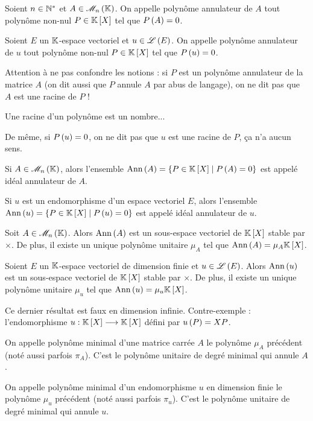 \begin{defi}
Soient \(n\in\mathbb{N}^*\) et \(A\in\M{n}\). On appelle polynôme annulateur de \(A\) tout polynôme non-nul \(P\in\poly\) tel que \(P\left(A\right)=0\).

Soient \(E\) un \(\mathbb{K}\)-espace vectoriel et \(u\in\mathscr{L}\left(E\right)\). On appelle polynôme annulateur de \(u\) tout polynôme non-nul \(P\in\poly\) tel que \(P\left(u\right)=0\).
\end{defi}

\begin{rem}
Attention à ne pas confondre les notions : si \(P\) est un polynôme annulateur de la matrice \(A\) (on dit aussi que \(P\) annule \(A\) par abus de langage), on ne dit pas que \(A\) est une racine de \(P\) !

Une racine d'un polynôme est un nombre...

De même, si \(P\left(u\right)=0\), on ne dit pas que \(u\) est une racine de \(P\), ça n'a aucun sens.
\end{rem}

\begin{defi}
Si \(A\in\M{n}\), alors l'ensemble \(\Ann{A}=\accol{P\in\poly\tq P\paren{A}=0}\) est appelé idéal annulateur de \(A\).

Si \(u\) est un endomorphisme d'un espace vectoriel \(E\), alors l'ensemble \(\Ann{u}=\accol{P\in\poly\tq P\paren{u}=0}\) est appelé idéal annulateur de \(u\).
\end{defi}

\begin{theo}
Soit \(A\in\M{n}\). Alors \(\operatorname{Ann}\left(A\right)\) est un sous-espace vectoriel de \(\poly\) stable par \(\times\). De plus, il existe un unique polynôme unitaire \(\mu_A\) tel que \(\Ann{A}=\mu_A\poly\).

Soient \(E\) un \(\mathbb{K}\)-espace vectoriel de dimension finie et \(u\in\mathscr{L}\left(E\right)\). Alors \(\operatorname{Ann}\left(u\right)\) est un sous-espace vectoriel de \(\poly\) stable par \(\times\). De plus, il existe un unique polynôme unitaire \(\mu_u\) tel que \(\Ann{u}=\mu_u\poly\).
\end{theo}

\begin{rem}
Ce dernier résultat est faux en dimension infinie. Contre-exemple : l'endomorphisme \(u:\poly\to\poly\) défini par \(u\left(P\right)=XP\).
\end{rem}

\begin{defi}
On appelle polynôme minimal d'une matrice carrée \(A\) le polynôme \(\mu_A\) précédent (noté aussi parfois \(\pi_A\)). C'est le polynôme unitaire de degré minimal qui annule \(A\).

On appelle polynôme minimal d'un endomorphisme \(u\) en dimension finie le polynôme \(\mu_u\) précédent (noté aussi parfois \(\pi_u\)). C'est le polynôme unitaire de degré minimal qui annule \(u\).
\end{defi}

